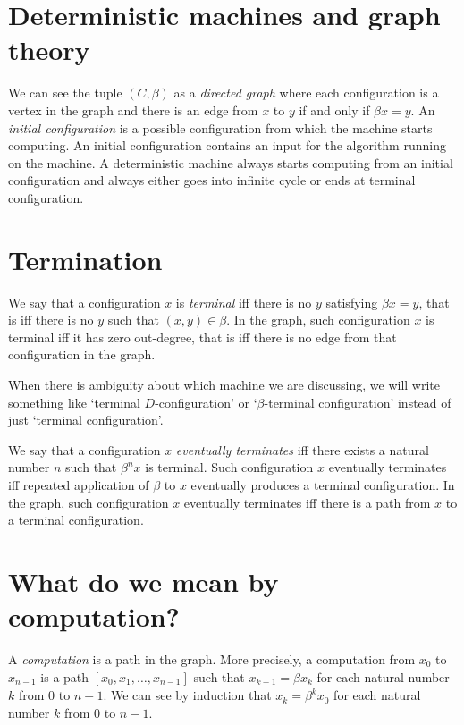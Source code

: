 \documentclass[10pt,statementpaper]{memoir}
\theoremstyle{definition}
\begin{document}
\section{Deterministic machines and graph theory}

We can see the tuple $(C,\beta)$ as a \emph{directed graph}
where each configuration is a vertex in the graph
and there is an edge from $x$ to $y$ if and only if $\beta x = y$.
An \emph{initial configuration} is a possible configuration from which the machine starts computing.
An initial configuration contains an input for the algorithm running on the machine.
A deterministic machine always starts computing from an initial configuration
and always either goes into infinite cycle or ends at terminal configuration.

\section{Termination}

We say that a configuration $x$ is \emph{terminal} iff
there is no $y$ satisfying $\beta x = y$, that is iff there is no $y$ such that $(x,y) \in \beta$.
In the graph, such configuration $x$ is terminal iff it has zero out-degree,
that is iff there is no edge from that configuration in the graph.

When there is ambiguity about which machine we are discussing,
we will write something like `terminal $D$-configuration'
or `$\beta$-terminal configuration' instead of just `terminal configuration'.

We say that a configuration $x$ \emph{eventually terminates}
iff there exists a natural number $n$ such that $\beta^n x$ is terminal.
Such configuration $x$ eventually terminates iff repeated application of $\beta$ to $x$
eventually produces a terminal configuration.
In the graph, such configuration $x$ eventually terminates iff
there is a path from $x$ to a terminal configuration.

\section{What do we mean by computation?}

A \emph{computation} is a path in the graph.
More precisely, a computation from $x_0$ to $x_{n-1}$
is a path $[x_0, x_1, \ldots, x_{n-1}]$
such that $x_{k+1} = \beta x_k$ for each natural number $k$ from $0$ to $n-1$.
We can see by induction that $x_k = \beta^k x_0$ for each natural number $k$ from $0$ to $n-1$.
\end{document}
